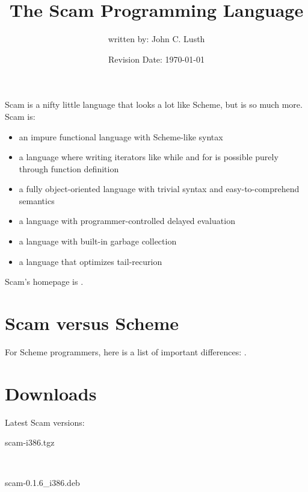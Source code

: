 \documentclass{article}
\title{The Scam Programming Language}
\author{written by: John C. Lusth}
\date{Revision Date: \today}
\begin{document}
\maketitle

\W{}

Scam is a nifty little language
that looks a lot like Scheme, but is so much more.
Scam is:

\begin{itemize}
    \item
        an impure functional language with Scheme-like syntax
    \item
        a language where writing iterators like while and for
        is possible purely through function definition
    \item
        a fully object-oriented language with trivial syntax and
        easy-to-comprehend semantics
    \item
        a language with programmer-controlled delayed
        evaluation
    \item
        a language with built-in garbage collection
    \item
        a language that optimizes tail-recurion
\end{itemize}

Scam's homepage is 
.

\section*{Scam versus Scheme}

For Scheme programmers, here is a list of important
differences: .

\section*{Downloads}

Latest Scam versions:

\begin{description}
    \item
         {scam-i386.tgz}
    \item
    \item
    \item
        ~
    \item
         {scam-0.1.6\_i386.deb}
    \item
\end{description}
\end{document}
